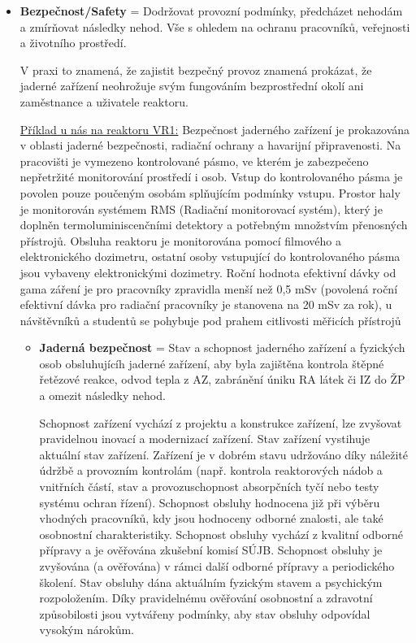 \begin{itemize}
    \item \textbf{Bezpečnost/Safety} = Dodržovat provozní podmínky, předcházet nehodám a zmírňovat následky nehod. Vše s ohledem na ochranu pracovníků, veřejnosti a životního prostředí.

    V praxi to znamená, že zajistit bezpečný provoz znamená prokázat, že jaderné zařízení neohrožuje svým fungováním bezprostřední okolí ani zaměstnance a uživatele reaktoru.

    \underline{Příklad u nás na reaktoru VR1:} Bezpečnost jaderného zařízení je prokazována v oblasti jaderné bezpečnosti, radiační ochrany a havarijní připravenosti. Na pracovišti je vymezeno kontrolované pásmo, ve kterém je zabezpečeno nepřetržité monitorování prostředí i osob. Vstup do kontrolovaného pásma je povolen pouze poučeným osobám splňujícím podmínky vstupu. Prostor haly je monitorován systémem RMS (Radiační monitorovací systém), který je doplněn termoluminiscenčními detektory a potřebným množstvím přenosných přístrojů. Obsluha reaktoru je monitorována pomocí filmového a elektronického dozimetru, ostatní osoby vstupující do kontrolovaného pásma jsou vybaveny elektronickými dozimetry. Roční hodnota efektivní dávky od gama záření je pro pracovníky zpravidla menší než 0,5 mSv (povolená roční efektivní dávka pro radiační pracovníky je stanovena na 20 mSv za rok), u návštěvníků a studentů se pohybuje pod prahem citlivosti měřicích přístrojů

    \begin{itemize}
        \item \textbf{Jaderná bezpečnost} = Stav a schopnost jaderného zařízení a fyzických osob obsluhujícíh jaderné zařízení, aby byla zajištěna kontrola štěpné řetězové reakce, odvod tepla z AZ, zabránění úniku RA látek či IZ do ŽP a omezit následky nehod.

        Schopnost zařízení vychází z projektu a konstrukce zařízení, lze zvyšovat pravidelnou inovací a modernizací zařízení. Stav zařízení vystihuje aktuální stav zařízení. Zařízení je v dobrém stavu udržováno díky náležité údržbě a provozním kontrolám (např. kontrola reaktorových nádob a vnitřních částí, stav a provozuschopnost absorpčních tyčí nebo testy systému ochran řízení). Schopnost obsluhy hodnocena již při výběru vhodných pracovníků, kdy jsou hodnoceny odborné znalosti, ale také osobnostní charakteristiky. Schopnost obsluhy vychází z kvalitní odborné přípravy a je ověřována zkušební komisí SÚJB. Schopnost obsluhy je zvyšována (a ověřována) v rámci další odborné přípravy a periodického školení. Stav obsluhy dána aktuálním fyzickým stavem a psychickým rozpoložením. Díky pravidelnému ověřování osobnostní a zdravotní způsobilosti jsou vytvářeny podmínky, aby stav obsluhy odpovídal vysokým nárokům.


\end{itemize}
\end{itemize}
